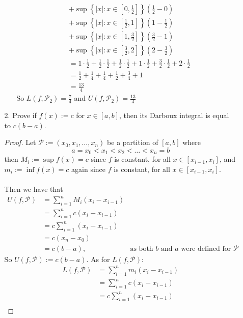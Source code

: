 \documentclass[12pt,letterpaper]{article}
\theoremstyle{case}
\theoremstyle{definition}
\begin{document}
\begin{enumerate}
\begin{enumerate}
\begin{enumerate}
\begin{align*}
					&+ \sup\left\{|x|: x \in \left[0,\frac{1}{2}\right]\right\}\left(\frac{1}{2}-0\right) \\
					&+ \sup\left\{|x|: x \in \left[\frac{1}{2}, 1\right]\right\}\left(1-\frac{1}{2}\right) \\
					&+ \sup\left\{|x|: x \in \left[1, \frac{3}{2}\right]\right\}\left(\frac{3}{2}-1\right) \\
					&+ \sup\left\{|x|: x \in \left[\frac{3}{2}, 2\right]\right\}\left(2-\frac{3}{2}\right) \\
					&= 1 \cdot \frac{1}{2} + \frac{1}{2} \cdot \frac{1}{2} + \frac{1}{2} \cdot \frac{1}{2} + 1 \cdot \frac{1}{2} + \frac{3}{2} \cdot \frac{1}{2} + 2 \cdot \frac{1}{2} \\
					&= \frac{1}{2} + \frac{1}{4} + \frac{1}{4}+ \frac{1}{2} + \frac{3}{4} + 1 \\
					&= \frac{13}{4}
				\end{align*}
				So $L(f,\mathcal{P}_2) = \frac{7}{4}$ and $U(f,\mathcal{P}_2) = \frac{13}{4}$\\
			\end{enumerate}
			\item[2.] Prove if $f(x):=c$ for $x \in [a,b]$, then its Darboux integral is equal to $c(b-a)$.
			\begin{proof}
				Let $\mathcal{P} := (x_0, x_1, \dots, x_n)$ be a partition of $[a,b]$ where
				\[a=x_0 < x_1 < x_2 < \dots < x_n=b\]
				then $M_i:= \sup f(x)=c$ since $f$ is constant, for all $x \in [x_{i-1}, x_i]$, and $m_i:= \inf f(x)=c$ again since $f$ is constant, for all $x \in [x_{i-1},x_i]$.
				\\\\Then we have that
				\begin{align*}
					U(f, \mathcal{P}) &= \sum_{i=1}^{n} M_i (x_i-x_{i-1}) \\
					&= \sum_{i=1}^{n} c (x_i-x_{i-1}) \\
					&= c \sum_{i=1}^{n} (x_i-x_{i-1}) \\
					&= c (x_n-x_0) \\
					&= c (b-a), &\text{as both $b$ and $a$ were defined for $\mathcal{P}$}
				\end{align*}
				So $U(f,\mathcal{P}):= c(b-a)$. As for $L(f,\mathcal{P})$:
				\begin{align*}
					L(f,\mathcal{P}) &= \sum_{i=1}^{n} m_i (x_i-x_{i-1}) \\
					&= \sum_{i=1}^{n} c (x_i-x_{i-1}) \\
					&= c \sum_{i=1}^{n} (x_i-x_{i-1}) \\

\end{align*}
\end{proof}
\end{enumerate}
\end{enumerate}
\end{document}
